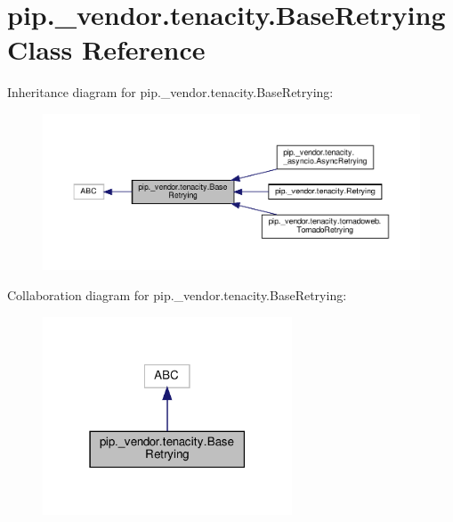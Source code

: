 \hypertarget{classpip_1_1__vendor_1_1tenacity_1_1BaseRetrying}{}\section{pip.\+\_\+vendor.\+tenacity.\+Base\+Retrying Class Reference}
\label{classpip_1_1__vendor_1_1tenacity_1_1BaseRetrying}


Inheritance diagram for pip.\+\_\+vendor.\+tenacity.\+Base\+Retrying\+:
\nopagebreak
\begin{figure}[H]
\begin{center}
\leavevmode
\includegraphics[width=350pt]{classpip_1_1__vendor_1_1tenacity_1_1BaseRetrying__inherit__graph}
\end{center}
\end{figure}


Collaboration diagram for pip.\+\_\+vendor.\+tenacity.\+Base\+Retrying\+:
\nopagebreak
\begin{figure}[H]
\begin{center}
\leavevmode
\includegraphics[width=210pt]{classpip_1_1__vendor_1_1tenacity_1_1BaseRetrying__coll__graph}
\end{center}
\end{figure}
